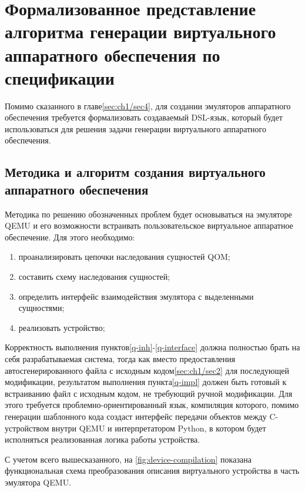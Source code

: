 \chapter{Формализованное представление алгоритма генерации виртуального аппаратного обеспечения по спецификации}\label{ch:ch2}

Помимо сказанного в главе\cref{sec:ch1/sec4}, для создании эмуляторов аппаратного обеспечения
требуется формализовать создаваемый DSL-язык, который будет использоваться для
решения задачи генерации виртуального аппаратного обеспечения.

\section{Методика и алгоритм создания виртуального аппаратного обеспечения}\label{sec:ch2/sec1}

Методика по решению обозначенных проблем будет основываться на эмуляторе QEMU и его
возможности встраивать пользовательское виртуальное аппаратное обеспечение.
Для этого необходимо:

\begin{enumerate}[label={\arabic*)}]
    \item \label{q-inh} проанализировать цепочки наследования сущностей QOM;
    \item \label{q-inh-scheme} составить схему наследования сущностей;
    \item \label{q-interface} определить интерфейс взаимодействия эмулятора с выделенными сущностями;
    \item \label{q-impl} реализовать устройство;
\end{enumerate}

Корректность выполнения пунктов\cref{q-inh}-\cref{q-interface} должна полностью брать на себя разрабатываемая система,
тогда как вместо предоставления автосгенерированного файла с исходным кодом\cref{sec:ch1/sec2} для
последующей модификации, результатом выполнения пункта\cref{q-impl} должен быть готовый к встраиванию
файл с исходным кодом, не требующий ручной модификации.
Для этого требуется проблемно-ориентированный язык, компиляция которого, помимо генерации шаблонного кода
создаст интерфейс передачи объектов между C-устройством внутри QEMU и интерпретатором Python, в
котором будет исполняться реализованная логика работы устройства.

С учетом всего вышесказанного, на \cref{fig:device-compilation} показана функциональная схема преобразования
описания виртуального устройства в часть эмулятора QEMU.

